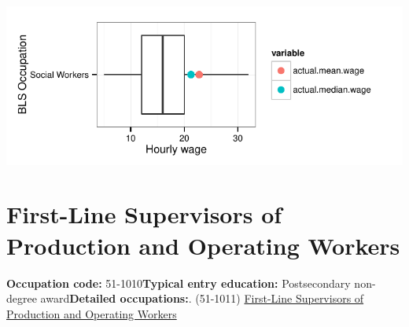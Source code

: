 \documentclass[a4paper,10pt]{article}\usepackage[]{graphicx}\usepackage[]{color}
\makeatletter
\def\maxwidth{ %
  \ifdim\Gin@nat@width>\linewidth
    \linewidth
  \else
    \Gin@nat@width
  \fi
}
\makeatother
\begin{document}
{\centering \includegraphics[width=\maxwidth]{figure/unnamed-chunk-254} 

}


\newpage\section{First-Line Supervisors of Production and Operating Workers}\textbf{Occupation code:} 51-1010\newline\textbf{Typical entry education:} Postsecondary non-degree award\newline\textbf{Detailed occupations:}. (51-1011)  \href{http://www.bls.gov/oes/current/oes511011.htm}{First-Line Supervisors of Production and Operating Workers}\newline%
\end{document}

